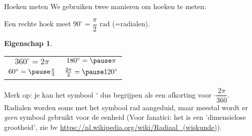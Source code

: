 \documentclass{beamer}
\newcommand{\degree}{^\circ}
\theoremstyle{eigenschap}
\newtheorem{proposition}{Eigenschap}
\providecommand{\p}{\pause}
\begin{document}
\begin{frame}{Hoeken meten}
%
We gebruiken twee manieren om hoeken te meten:

\begin{definition}
	Een rechte hoek meet $90\degree = \dfrac{\pi}{2}$ rad (=radialen).
\end{definition}
%

\begin{proposition}
	\begin{tabular}{cc}
		$360\degree = 2\pi $ & $180\degree = \p\pi $ \\
		$ 60\degree =\p \frac{\pi}{3}$ & $\frac{2\pi}{3} = \p 120\degree$
	\end{tabular}
\end{proposition}
%
Merk op: je kan het symbool $\degree$ dus begrijpen als een afkorting voor $\cdot\dfrac{2\pi}{360}$. Radialen worden soms met het symbool rad aangeduid, maar meestal wordt er \textit{geen} symbool gebruikt voor de eenheid (Voor fanatici: het is een 'dimensielose grootheid', zie bv \url{https://nl.wikipedia.org/wiki/Radiaal\_(wiskunde)}).  

\end{frame}
\end{document}
